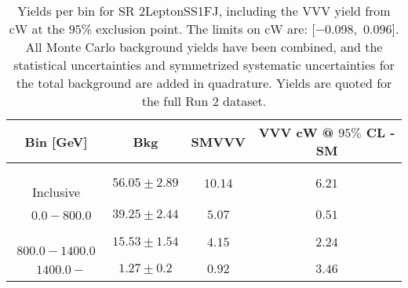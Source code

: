 \begin{table}[!htbp]
    \small
    \center
    \begin{tabular}{c||c|c|c}
    Bin [GeV] & Bkg & SMVVV & \pbox{20cm}{VVV \\ cW @ $95\%$ CL - SM \\ }\\
    \hline
    \pbox{20cm}{ ~ \\Inclusive\\ } & $56.05 \pm 2.89$ & $10.14$ & $6.21$\\
    \hline
    \pbox{20cm}{ ~ \\$0.0-800.0$\\ } & $39.25 \pm 2.44$ & $5.07$ & $0.51$\\
    \hline
    \pbox{20cm}{ ~ \\$800.0-1400.0$\\ } & $15.53 \pm 1.54$ & $4.15$ & $2.24$\\
    \hline
    \pbox{20cm}{ ~ \\$1400.0-$\\ } & $1.27 \pm 0.2$ & $0.92$ & $3.46$\\
\end{tabular}
    \caption{Yields per bin for SR 2LeptonSS1FJ, including the VVV yield from cW at the $95$\% exclusion point. The limits on cW are: [$-0.098$,~$0.096$]. All Monte Carlo background yields have been combined, and the statistical uncertainties and symmetrized systematic uncertainties for the total background are added in quadrature. Yields are quoted for the full Run 2 dataset.}
    \label{tab:2LeptonSS1FJ$binssignal}
\end{table}
